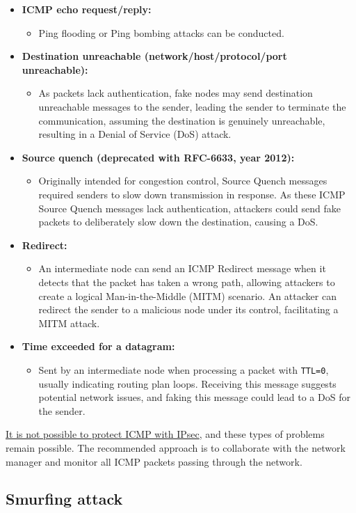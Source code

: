 \begin{itemize}
    \item \textbf{ICMP echo request/reply:}
    \begin{itemize}
        \item Ping flooding or Ping bombing attacks can be conducted.
    \end{itemize}

    \item \textbf{Destination unreachable (network/host/protocol/port unreachable):}
    \begin{itemize}
        \item As packets lack authentication, fake nodes may send destination unreachable messages to the sender, leading the sender to terminate the communication, assuming the destination is genuinely unreachable, resulting in a Denial of Service (DoS) attack.
    \end{itemize}

    \item \textbf{Source quench (deprecated with RFC-6633, year 2012):}
    \begin{itemize}
        \item Originally intended for congestion control, Source Quench messages required senders to slow down transmission in response. As these ICMP Source Quench messages lack authentication, attackers could send fake packets to deliberately slow down the destination, causing a DoS.
    \end{itemize}

    \item \textbf{Redirect:}
    \begin{itemize}
        \item An intermediate node can send an ICMP Redirect message when it detects that the packet has taken a wrong path, allowing attackers to create a logical Man-in-the-Middle (MITM) scenario. An attacker can redirect the sender to a malicious node under its control, facilitating a MITM attack.
    \end{itemize}

    \item \textbf{Time exceeded for a datagram:}
    \begin{itemize}
        \item Sent by an intermediate node when processing a packet with \texttt{TTL=0}, usually indicating routing plan loops. Receiving this message suggests potential network issues, and faking this message could lead to a DoS for the sender.
    \end{itemize}
\end{itemize}

\ul{It is not possible to protect ICMP with IPsec}, and these types of problems remain possible. The recommended approach is to collaborate with the network manager and monitor all ICMP packets passing through the network.

\subsection{Smurfing attack}